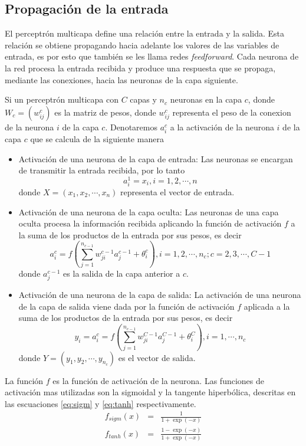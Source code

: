 \subsection{Propagación de la entrada}
El perceptrón multicapa define una relación entre la entrada y la salida. Esta relación se obtiene propagando hacia adelante los valores de las variables de entrada, es por esto que también se les llama redes {\em feedforward}. Cada neurona de la red procesa la entrada recibida y produce una respuesta que se propaga, mediante las conexiones, hacia las neuronas de la capa siguiente.

Si un perceptrón multicapa con $C$ capas y $n_c$ neuronas en la capa $c$, donde $W_c = (w^{c}_{ij})$ es la matriz de pesos, donde $w^{c}_{ij}$ representa el peso de la conexion de la neurona $i$ de la capa $c$. Denotaremos $a^{c}_{i}$ a la activación de la neurona $i$ de la capa $c$ que se calcula de la siguiente manera
\begin{itemize}
	\item Activación de una neurona de la capa de entrada: Las neuronas se encargan de transmitir la entrada recibida, por lo tanto $$ a^{1}_{i} = x_{i}, i = 1, 2, \cdots, n$$ donde $X = (x_1, x_2, \cdots, x_n)$ representa el vector de entrada.

	\item Activación de una neurona de la capa oculta: Las neuronas de una capa oculta procesa la información recibida aplicando la función de activación $f$ a la suma de los productos de la entrada por sus pesos, es decir $$ a^{c}_{i} = f\left(\sum^{n_{c - 1}}_{j=1} w^{c - 1}_{ji}a^{c - 1}_{j} + \theta^{c}_{i}\right), i = 1, 2, \cdots, n_c; c = 2, 3, \cdots, C - 1$$ donde $a^{c - 1}_{j}$ es la salida de la capa anterior a $c$.

	\item Activación de una neurona de la capa de salida: La activación de una neurona de la capa de salida viene dada por la función de activación $f$ aplicada a la suma de los productos de la entrada por sus pesos, es decir $$ y_{i} = a^{c}_{i} = f\left(\sum^{n_{c - 1}}_{j=1} w^{C - 1}_{ji}a^{C - 1}_{j} + \theta^{C}_{i}\right), i = 1, \cdots, n_c$$ donde $Y = (y_1, y_2, \cdots, y_{n_{c}})$ es el vector de salida.
\end{itemize}

La función $f$ es la función de activación de la neurona. Las funciones de activación mas utilizadas son la sigmoidal y la tangente hiperbólica, descritas en las escuaciones \ref{eq:sigm} y \ref{eq:tanh} respectivamente.
\begin{eqnarray}
	f_{sigm}(x) &=& \frac{1}{1+\exp(-x)}\label{eq:sigm}\\
	f_{tanh}(x) &=& \frac{1 - \exp(-x)}{1 + \exp(-x)}\label{eq:tanh}
\end{eqnarray}

